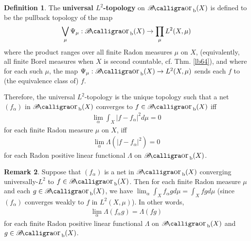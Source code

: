 \documentclass[12pt,b5paper,notitlepage]{article}
\theoremstyle{definition}
\newtheorem{df}{Definition}[subsection]
\newtheorem{rem}[df]{Remark}
\theoremstyle{plain}
\DeclareMathOperator{\Borb}{{\mathscr{B}\text{\kern -2pt {\calligra\large or}}\,}_{\mathrm b}}
\newcommand{\hqed}{\hfill\qedsymbol}
\numberwithin{equation}{section}
\begin{document}
\begin{df}
The \textbf{universal $L^2$-topology}  on $\Borb(X)$ is defined to be the pullback topology of the map
\begin{align*}
\bigvee_\mu \Psi_\mu:\Borb(X)\rightarrow \prod_\mu L^2(X,\mu)
\end{align*}
where the product ranges over all finite Radon measures $\mu$ on $X$, (equivalently, all finite Borel measures when $X$ is second countable, cf. Thm. \ref{lb64}), and where for each such $\mu$, the map $\Psi_\mu:\Borb(X)\rightarrow L^2(X,\mu)$ sends each $f$ to (the equivalence class of) $f$.

Therefore, the universal $L^2$-topology is the unique topology such that a net $(f_\alpha)$ in $\Borb(X)$ converges to $f\in\Borb(X)$ iff
\begin{align*}
\lim_\alpha \int_X|f-f_\alpha|^2d\mu=0
\end{align*}
for each finite Radon measure $\mu$ on $X$, iff
\begin{align*}
\lim_\alpha\Lambda(|f-f_\alpha|^2)=0
\end{align*}
for each Radon positive linear functional $\Lambda$ on $\Borb(X)$. \hqed
\end{df}

\begin{rem}\label{lb277}
Suppose that $(f_\alpha)$ is a net in $\Borb(X)$ converging universally-$L^2$ to $f\in\Borb(X)$. Then for each finite Radon measure $\mu$ and each $g\in\Borb(X)$, we have $\lim_\alpha\int_X f_\alpha g d\mu=\int_Xf gd\mu$ (since $(f_\alpha)$ converges weakly to $f$ in $L^2(X,\mu)$). In other words,
\begin{align}
\lim_\alpha\Lambda(f_\alpha g)=\Lambda(fg)
\end{align}
for each finite Radon positive linear functional $\Lambda$ on $\Borb(X)$ and $g\in\Borb(X)$. 
\end{rem}
\end{document}
